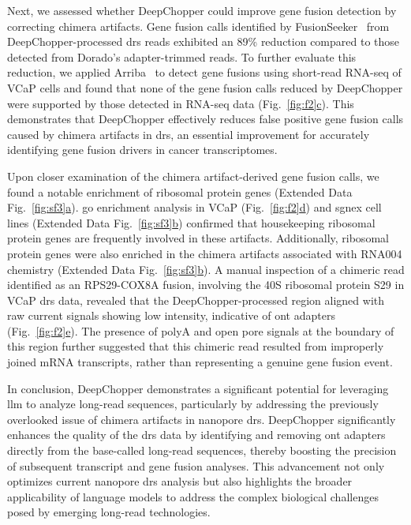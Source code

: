 \documentclass[pdflatex,sn-nature, lineno]{sn-jnl}%
\newcommand{\figref}[2]{Fig.~\hyperref[#1]{\ref*{#1}#2}}
\newcommand{\edfigref}[2]{Extended Data Fig.~\hyperref[#1]{\ref*{#1}#2}}
\begin{document}
Next, we assessed whether DeepChopper could improve gene fusion detection by correcting chimera artifacts. Gene fusion calls identified by FusionSeeker~\cite{chen2023gene} from DeepChopper-processed \gls{drs} reads exhibited an 89\% reduction compared to those detected from Dorado's adapter-trimmed reads.
To further evaluate this reduction, we applied Arriba~\cite{uhrig2021accurate} to detect gene fusions using short-read RNA-seq of VCaP cells and found that none of the gene fusion calls reduced by DeepChopper were supported by those detected in RNA-seq data (\figref{fig:f2}{c}).
This demonstrates that DeepChopper effectively reduces false positive gene fusion calls caused by chimera artifacts in \gls{drs}, an essential improvement for accurately identifying gene fusion drivers in cancer transcriptomes.

Upon closer examination of the chimera artifact-derived gene fusion calls, we found a notable enrichment of ribosomal protein genes (\edfigref{fig:sf3}{a}).
\gls{go} enrichment analysis in VCaP (\figref{fig:f2}{d}) and \gls{sgnex} cell lines (\edfigref{fig:sf3}{b}) confirmed that housekeeping ribosomal protein genes are frequently involved in these artifacts.
Additionally, ribosomal protein genes were also enriched in the chimera artifacts associated with RNA004 chemistry (\edfigref{fig:sf3}{b}).
A manual inspection of a chimeric read identified as an RPS29-COX8A fusion, involving the 40S ribosomal protein S29 in VCaP \gls{drs} data, revealed that the DeepChopper-processed region aligned with raw current signals showing low intensity, indicative of \gls{ont} adapters (\figref{fig:f2}{e}).
The presence of polyA and open pore signals at the boundary of this region further suggested that this chimeric read resulted from improperly joined mRNA transcripts, rather than representing a genuine gene fusion event.

In conclusion, DeepChopper demonstrates a significant potential for leveraging \gls{llm} to analyze long-read sequences, particularly by addressing the previously overlooked issue of chimera artifacts in nanopore \gls{drs}.
DeepChopper significantly enhances the quality of the \gls{drs} data by identifying and removing \gls{ont} adapters directly from the base-called long-read sequences, thereby boosting the precision of subsequent transcript and gene fusion analyses.
This advancement not only optimizes current nanopore \gls{drs} analysis but also highlights the broader applicability of language models to address the complex biological challenges posed by emerging long-read technologies.
\end{document}
